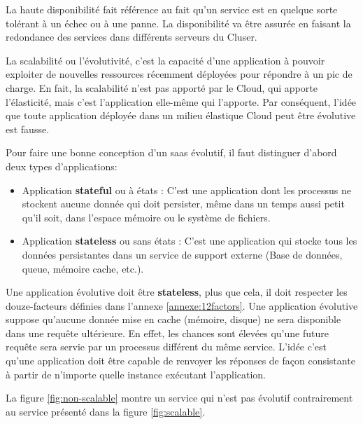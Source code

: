 \begin{onehalfspace}
La haute disponibilité fait référence au fait qu'un service est en quelque sorte tolérant à un échec ou à une panne. La disponibilité va être assurée en faisant la redondance des services dans différents serveurs du Cluser.

La scalabilité ou l'évolutivité, c'est la capacité d'une application à pouvoir exploiter de nouvelles ressources récemment déployées pour répondre à un pic de charge. En fait, la scalabilité n'est pas apporté par le Cloud, qui apporte l'élasticité, mais c'est l'application elle-même qui l'apporte. Par conséquent, l'idée que toute application déployée dans un milieu élastique Cloud peut être évolutive est fausse.


Pour faire une bonne conception d'un \acrshort{saas} évolutif, il faut distinguer d'abord deux types d'applications:

\begin{itemize}
	\item Application \textbf{stateful} ou à états : C'est une application dont les processus ne stockent aucune donnée qui doit persister, même dans un temps aussi petit qu'il soit, dans l'espace mémoire ou le système de fichiers.
	\item Application \textbf{stateless} ou sans états : C'est une application qui stocke tous les données persistantes dans un service de support externe (Base de données, queue, mémoire cache, etc.).
\end{itemize}

Une application évolutive doit être \textbf{stateless}, plus que cela, il doit respecter les douze-facteurs définies dans l'annexe \ref{annexe:12factors}. Une application évolutive suppose qu'aucune donnée mise en cache (mémoire, disque) ne sera disponible dans une requête ultérieure. En effet, les chances sont élevées qu'une future requête sera servie par un processus différent du même service. L'idée c'est qu'une application doit être capable de renvoyer les réponses de façon consistante à partir de n'importe quelle instance exécutant l'application.



La figure \ref{fig:non-scalable} montre un service qui n'est pas évolutif contrairement au service présenté dans la figure \ref{fig:scalable}.



\end{onehalfspace}
